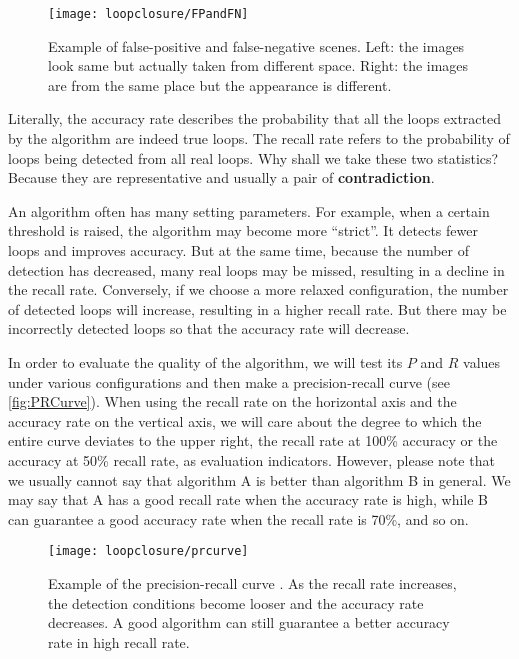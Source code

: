 \begin{figure}[!htp]
	\centering
	\texttt{[image: loopclosure/FPandFN]}
	\caption{Example of false-positive and false-negative scenes. Left: the images look same but actually taken from different space. Right: the images are from the same place but the appearance is different.}
	\label{fig:FPandFN}
\end{figure}

Literally, the accuracy rate describes the probability that all the loops extracted by the algorithm are indeed true loops. The recall rate refers to the probability of loops being detected from all real loops. Why shall we take these two statistics? Because they are representative and usually a pair of \textbf{contradiction}.

An algorithm often has many setting parameters. For example, when a certain threshold is raised, the algorithm may become more ``strict''. It detects fewer loops and improves accuracy. But at the same time, because the number of detection has decreased, many real loops may be missed, resulting in a decline in the recall rate. Conversely, if we choose a more relaxed configuration, the number of detected loops will increase, resulting in a higher recall rate. But there may be incorrectly detected loops so that the accuracy rate will decrease.

In order to evaluate the quality of the algorithm, we will test its $P$ and $R$ values under various configurations and then make a precision-recall curve (see \autoref{fig:PRCurve}). When using the recall rate on the horizontal axis and the accuracy rate on the vertical axis, we will care about the degree to which the entire curve deviates to the upper right, the recall rate at 100\% accuracy or the accuracy at 50\% recall rate, as evaluation indicators. However, please note that we usually cannot say that algorithm A is better than algorithm B in general. We may say that A has a good recall rate when the accuracy rate is high, while B can guarantee a good accuracy rate when the recall rate is 70\%, and so on.

\begin{figure}[!ht]
	\centering
	\texttt{[image: loopclosure/prcurve]}
	\caption{Example of the precision-recall curve {\cite{Gao2015a}}. As the recall rate increases, the detection conditions become looser and the accuracy rate decreases. A good algorithm can still guarantee a better accuracy rate in high recall rate.}
	\label{fig:PRCurve}
\end{figure}

